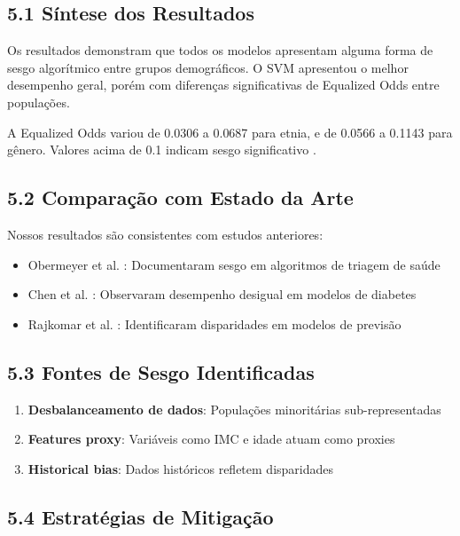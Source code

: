 \documentclass[12pt,a4paper]{article}
\begin{document}
\subsection{5.1 Síntese dos Resultados}

Os resultados demonstram que todos os modelos apresentam alguma forma de 
sesgo algorítmico entre grupos demográficos. O SVM apresentou o melhor 
desempenho geral, porém com diferenças significativas de Equalized Odds 
entre populações.

A Equalized Odds variou de 0.0306 a 0.0687 para etnia, e de 0.0566 a 
0.1143 para gênero. Valores acima de 0.1 indicam sesgo significativo 
\cite{hardt2016}.

\subsection{5.2 Comparação com Estado da Arte}

Nossos resultados são consistentes com estudos anteriores:
\begin{itemize}
    \item Obermeyer et al. \cite{obermeyer2019}: Documentaram sesgo em 
          algoritmos de triagem de saúde
    \item Chen et al. \cite{chen2019}: Observaram desempenho desigual em 
          modelos de diabetes
    \item Rajkomar et al. \cite{rajkomar2018}: Identificaram disparidades 
          em modelos de previsão
\end{itemize}

\subsection{5.3 Fontes de Sesgo Identificadas}

\begin{enumerate}
    \item \textbf{Desbalanceamento de dados}: Populações minoritárias 
          sub-representadas \cite{mehrabi2021}
    \item \textbf{Features proxy}: Variáveis como IMC e idade atuam como 
          proxies \cite{lum2016}
    \item \textbf{Historical bias}: Dados históricos refletem disparidades 
          \cite{friedler2019}
\end{enumerate}

\subsection{5.4 Estratégias de Mitigação}
\end{document}

